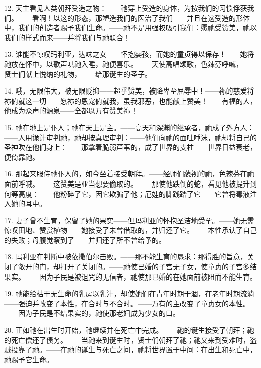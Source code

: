 12. 天主看见人类朝拜受造之物：——祂穿上受造的身体，为按我们的习惯俘获我们。——看啊！以这的形态，那塑造我们的医治了我们——并且在这受造的形体中，我们的创造者赐予我们生命。——祂不是用强权吸引我们：愿祂受赞美，祂以我们的样式而来——并将我们与祂联合！\par

13. 谁能不惊叹玛利亚，达味之女——怀抱婴孩，而她的童贞得以保存！——她将祂放在怀中，以歌声哄祂入睡，祂便喜乐。——天使高唱颂歌，色辣芬呼喊，——贤士们献上悦纳的礼物，——给那诞生的圣子。\par

14. 哦，无限伟大，被无限贬抑——超乎赞美，被降卑至屈辱中！——祢的慈爱将祢俯就这一切——愿祢的恩宠俯就我，虽我邪恶，也能献上赞美！——有福的人，他成为众声的源泉——全都以万有赞美祢！\par

15. 祂在地上是仆人；祂在天上是主。——高天和深渊的继承者，祂成了外方人：——人用诡计审判祂，祂却按真理审判：——他们向祂的面吐唾沫，祂却将自己的圣神吹在他们身上：——那拿着脆弱芦苇的，成了世界的支柱——世界日益衰老，便倚靠祂。\par

16. 那起来服侍祂仆人的，如今坐着接受朝拜。——经师们藐视的祂，色辣芬在祂面前呼喊。——这赞美是亚当想要偷取的。——那使他跌倒的蛇，看见他被提升到何等高度：——他粉碎了它，因它欺骗了他；厄娃的脚践踏了它——它曾将毒液注入她的耳中。\par

17. 妻子曾不生育，保留了她的果实——但玛利亚的怀抱圣洁地受孕。——她无需惊叹田地、赞赏植物——她接受了未曾借取的，并归还了它。——本性承认了自己的失败；母腹觉察到了——并归还了所不曾给予的。\par

18. 玛利亚在判断中被依撒伯尔击败。——那不能生育的恳求：那得胜的旨意，关闭了敞开的门，却打开了关闭的。——祂使已婚的子宫无子女，使童贞的子宫多结果实。——因为子民是被诅咒的无信者，祂使那已婚的在她面前被阻而不能生育。\par

19. 祂能给枯干无生命的乳房以乳汁，却使她们在青年时期干涸，在老年时期流淌——强迫并改变了本性，在合时与不合时。——万有的主改变了童贞女的本性。——因为子民是不结果实的，祂使那老妇成为少女的口。\par

20. 正如祂在出生时开始，祂继续并在死亡中完成。——祂的诞生接受了朝拜；祂的死亡偿还了债务。——当祂来到诞生时，贤士们朝拜了祂；祂又来到受难时，盗贼投靠了祂。——在祂的诞生与死亡之间，祂将世界置于中间：在出生和死亡中，祂赐予它生命。\par


